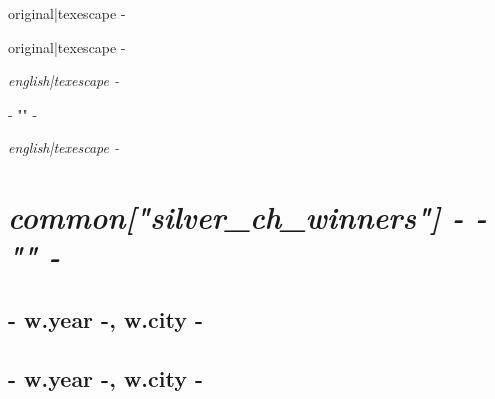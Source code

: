 {%

{%
{%
{\large {{ original|texescape -}} } 
{%
{%
\begin{addmargin}[-0.05em]{0em}{\large {{ original|texescape -}} }\end{addmargin}{\itshape {{ english|texescape -}} }
{%
\begin{addmargin}[-0.05em]{0em}{\large{ {{- "}}" -}}\end{addmargin}{\itshape {{ english|texescape -}} }
{%
{\large{}}
{%
{%
{%

{%
{%
{%
{%
{%
{%
{%
{%
{%
{%

{%
\chapter*{\hfill{\slshape {{ common["silver_ch_winners"] -}} {{- "}}" -}}
\thispagestyle{empty}
\vspace{70pt}
{%
{%
    \section*{ {{- w.year -}}, {{ w.city -}} }
{%
    \section*{ {{- w.year -}}, {{ w.city -}} }
{%
{%
    {%
}}}}}}}}}}}}}}}}}}}}}}}}}}}
